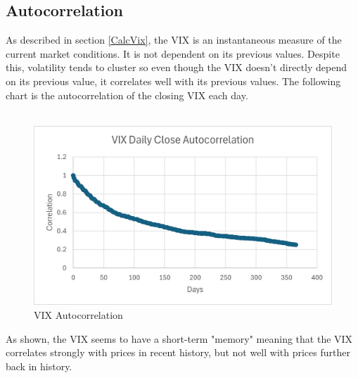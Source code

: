 \documentclass[11pt, oneside]{book}
\begin{document}
\subsection{Autocorrelation} \label{SigOfVIX-VIXBehave-AutoCorrel}
As described in section \ref{CalcVix}, the VIX is an instantaneous measure of the current market conditions. It is not dependent on its previous values. Despite this, volatility tends to cluster so even though the VIX doesn't directly depend on its previous value, it correlates well with its previous values. The following chart is the autocorrelation of the closing VIX each day.
\\
\\
\begin{figure}[H]
\centering
\includegraphics[width=\textwidth]{VIXAutocorrelation.png}
\caption{VIX Autocorrelation} \label{Fig-VIXAutocorrelation}
\end{figure}
\noindent
As shown, the VIX seems to have a short-term "memory" meaning that the VIX correlates strongly with prices in recent history, but not well with prices further back in history.
\end{document}
